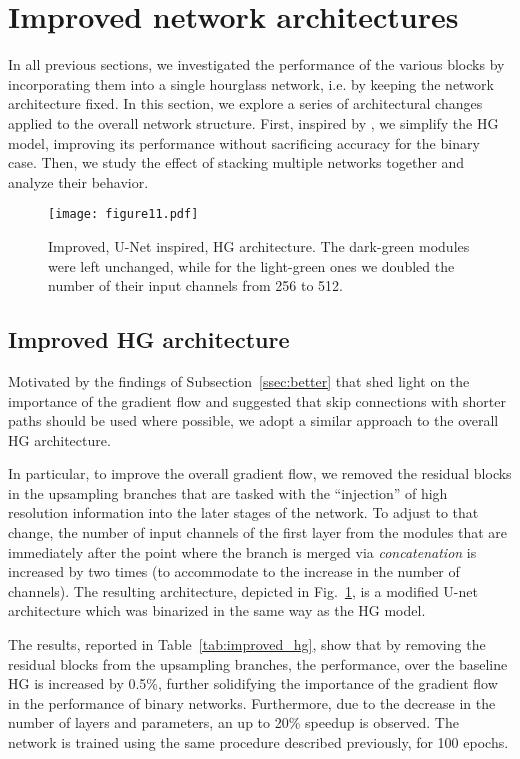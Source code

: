 \documentclass[10pt,journal,compsoc]{IEEEtran}
\begin{document}
\section{Improved network architectures} \label{sec:network-architectures}

In all previous sections, we investigated the performance of the various blocks by incorporating them into a single hourglass network, i.e. by keeping the network architecture fixed. In this section, we explore a series of architectural changes applied to the overall network structure. First, inspired by \cite{ronneberger2015u}, we simplify the HG model, improving its performance without sacrificing accuracy for the binary case. Then, we study the effect of stacking multiple networks together and analyze their behavior.

\begin{figure}[!htb]
    \centering
    \texttt{[image: figure11.pdf]}
    \caption{Improved, U-Net inspired, HG architecture. The dark-green modules were left unchanged, while for the light-green ones we doubled the number of their input channels from 256 to 512.}
    \label{fig:improved-hg}
\end{figure}

\subsection{Improved HG architecture}\label{ssec:improved-hg}
Motivated by the findings of Subsection~\ref{ssec:better} that shed light on the importance of the gradient flow and suggested that skip connections with shorter paths should be used where possible, we adopt a similar approach to the overall HG architecture.

In particular, to improve the overall gradient flow, we removed the residual blocks in the upsampling branches that are tasked with the ``injection'' of high resolution information into the later stages of the network. To adjust to that change, the number of input channels of the first layer from the modules that are immediately after the point where the branch is merged via \textit{concatenation} is increased by two times (to accommodate to the increase in the number of channels). {\color{black} The resulting architecture, depicted in Fig.~\ref{fig:improved-hg}, is a modified U-net architecture\cite{ronneberger2015u} which was binarized in the same way  as the HG model.}

The results, reported in Table~\ref{tab:improved_hg}, show that by removing the residual blocks from the upsampling branches, the performance, over the baseline HG is increased by 0.5\%, further solidifying the importance of the gradient flow in the performance of binary networks. Furthermore, due to the decrease in the number of layers and parameters, an up to 20\% speedup is observed.
The network is trained using the same procedure described previously, for 100 epochs.
\end{document}
